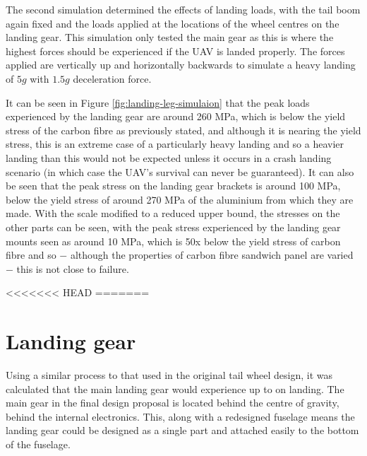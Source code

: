 \documentclass[../../main.tex]{subfiles}
\begin{document}
The second simulation determined the effects of landing loads, with the tail boom again fixed and the loads applied at the locations of the wheel centres on the landing gear.
This simulation only tested the main gear as this is where the highest forces should be experienced if the UAV is landed properly.
The forces applied are  vertically up and  horizontally backwards to simulate a heavy landing of $5g$ with $1.5g$ deceleration force. 


It can be seen in Figure \ref{fig:landing-leg-simulaion} that the peak loads experienced by the landing gear are around 260 MPa, which is below the yield stress of the carbon fibre as previously stated, and although it is nearing the yield stress, this is an extreme case of a particularly heavy landing and so a heavier landing than this would not be expected unless it occurs in a crash landing scenario (in which case the UAV's survival can never be guaranteed).
It can also be seen that the peak stress on the landing gear brackets is around 100 MPa, below the yield stress of around 270 MPa of the aluminium from which they are made.
With the scale modified to a reduced upper bound, the stresses on the other parts can be seen, with the peak stress experienced by the landing gear mounts seen as around 10 MPa, which is 50x below the yield stress of carbon fibre and so $-$ although the properties of carbon fibre sandwich panel are varied $-$ this is not close to failure. 

<<<<<<< HEAD
=======
\section{Landing gear} \label{sec:final-design-proposal:landing-gear}

Using a similar process to that used in the original tail wheel design, it was calculated that the main landing gear would experience up to  on landing.  %
The main gear in the final design proposal is located behind the centre of gravity, behind the internal electronics.
This, along with a redesigned fuselage means the landing gear could be designed as a single part and attached easily to the bottom of the fuselage. 
\end{document}

